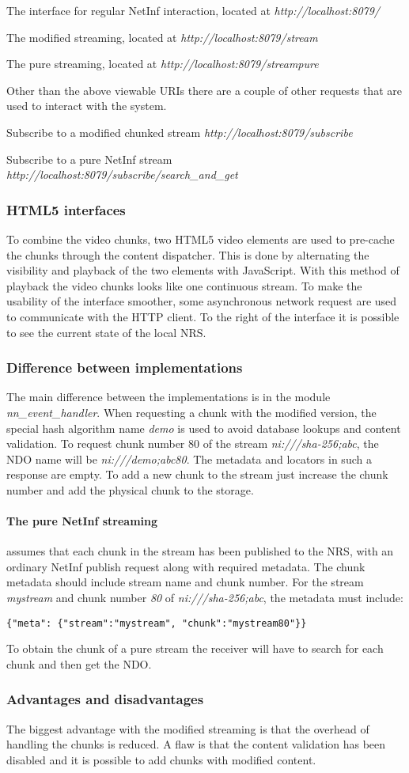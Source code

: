 The interface for regular NetInf interaction, located at 
\textit{http://localhost:8079/}

The modified streaming, located at
\textit{http://localhost:8079/stream}

The pure streaming, located at
\textit{http://localhost:8079/streampure}

Other than the above viewable URIs there are a couple of other requests that are used to interact with the system. 

Subscribe to a modified chunked stream
\textit{http://localhost:8079/subscribe}

Subscribe to a pure NetInf stream
\textit{http://localhost:8079/subscribe/search\_and\_get}


\subsubsection{HTML5 interfaces}
To combine the video chunks, two HTML5 video elements are used to pre-cache the chunks through the content dispatcher. This is done by alternating the visibility and playback of the two elements with JavaScript. With this method of playback the video chunks looks like one continuous stream. 
To make the usability of the interface smoother, some asynchronous network request are used to communicate with the HTTP client.
To the right of the interface it is possible to see the current state of the local NRS. 

\subsubsection{Difference between implementations}
The main difference between the implementations is in the module \textit{nn\_event\_handler}. When requesting a chunk with the modified version, the special hash algorithm name \textit{demo} is used to avoid database lookups and content validation. To request chunk number 80 of the stream \textit{ni:///sha-256;abc}, the NDO name will be \textit{ni:///demo;abc80}. The metadata and locators in such a response are empty. To add a new chunk to the stream just increase the chunk number and add the physical chunk to the storage. 
\paragraph{The pure NetInf streaming} assumes that each chunk in the stream has been published to the NRS, with an ordinary NetInf publish request along with required metadata. The chunk metadata should include stream name and chunk number. For the stream \textit{mystream} and chunk number \textit{80} of \textit{ni:///sha-256;abc}, the metadata must include:
\begin{verbatim}
{"meta": {"stream":"mystream", "chunk":"mystream80"}}
\end{verbatim}
To obtain the chunk of a pure stream the receiver will have to search for each chunk and then get the NDO.

\subsubsection{Advantages and disadvantages}
The biggest advantage with the modified streaming is that the overhead of handling the chunks is reduced. A flaw is that the content validation has been disabled and it is possible to add chunks with modified content. 